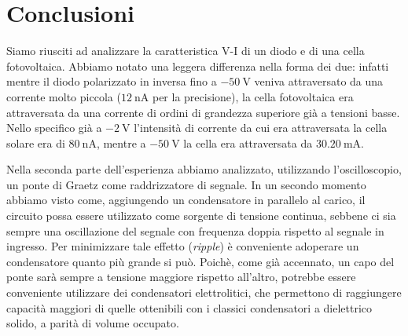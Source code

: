 \section{Conclusioni}
Siamo riusciti ad analizzare la caratteristica V-I di un diodo e di una cella fotovoltaica. Abbiamo notato una leggera differenza nella forma dei due: infatti mentre il diodo polarizzato in inversa fino a $\SI{-50}{\volt}$ veniva attraversato da una corrente molto piccola ($\SI{12}{\nano\ampere}$ per la precisione), la cella fotovoltaica era attraversata da una corrente di ordini di grandezza superiore già a tensioni basse. Nello specifico già a $\SI{-2}{\volt}$ l'intensità di corrente da cui era attraversata la cella solare era di $\SI{80}{\nano\ampere}$, mentre a $\SI{-50}{\volt}$ la cella era attraversata da $\SI{30.20}{\milli\ampere}$.

Nella seconda parte dell'esperienza abbiamo analizzato, utilizzando l'oscilloscopio, un ponte di Graetz come raddrizzatore di segnale. In un secondo momento abbiamo visto come, aggiungendo un condensatore in parallelo al carico, il circuito possa essere utilizzato come sorgente di tensione continua, sebbene ci sia sempre una oscillazione del segnale con frequenza doppia rispetto al segnale in ingresso. Per minimizzare tale effetto (\emph{ripple}) è conveniente adoperare un condensatore quanto più grande si può.
Poichè, come già accennato, un capo del ponte sarà sempre a tensione maggiore rispetto all'altro, potrebbe essere conveniente utilizzare dei condensatori elettrolitici, che permettono di raggiungere capacità maggiori di quelle ottenibili con i classici condensatori a dielettrico solido, a parità di volume occupato.